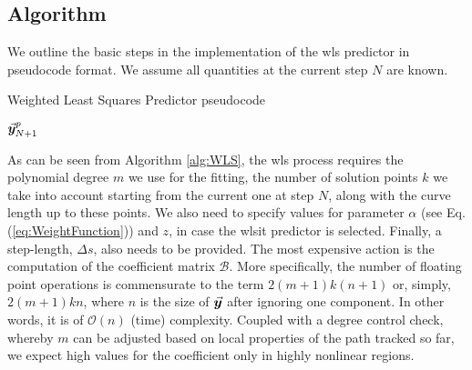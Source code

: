\subsection{Algorithm}\label{CH5-S3SS1}
We outline the basic steps in the implementation of the \acrshort{wls}
predictor in pseudocode format. We assume all quantities at the current step
$N$ are known.

\begin{algorithm}[t]
	\caption{Weighted Least Squares Predictor pseudocode}
	\label{alg:WLS}
	\begin{algorithmic}
		\ENDFOR
		\STATE{}
		\STATE{}
		\STATE{}
		\RETURN $\vec{\bm{y}}^p_{N+1}$
	\end{algorithmic}
\end{algorithm}

As can be seen from Algorithm \ref{alg:WLS}, the \acrshort{wls} process 
requires the 
polynomial degree  $m$ we use for the fitting, the number of solution 
points $k$ we take into account starting from the current one at step $N$, 
along with the curve length up to these points. We also need to specify values 
for
parameter $\alpha$ (see Eq. (\ref{eq:WeightFunction})) and $z$, in case the 
\acrshort{wlsit}
predictor is selected. Finally, a step-length, $\Delta s$, also needs to be
provided. The most expensive action is the computation of the coefficient matrix
$\bm{\mathcal{B}}$. More specifically, the number of floating point operations 
is
commensurate to the term $2(m+1)k(n+1)$ or, simply, $2(m+1)kn$, where $n$ is
the size of $\vec{\bm{y}}$ after ignoring one component. In other words, it
is of $\mathcal{O}(n)$ (time) complexity. Coupled with a degree control check, 
whereby
$m$ can be adjusted based on local properties of the path tracked so far, we 
expect high values for the coefficient only in highly nonlinear regions. 

